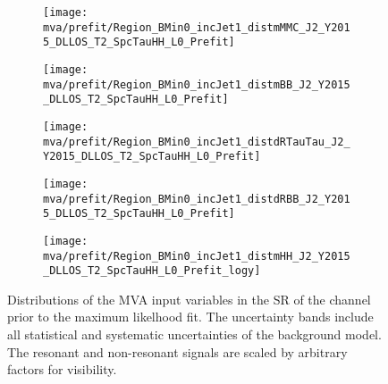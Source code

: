 \begin{figure}[htbp]
  \centering

  \begin{subfigure}[t]{.46\textwidth}
    \texttt{[image: mva/prefit/Region\_BMin0\_incJet1\_distmMMC\_J2\_Y2015\_DLLOS\_T2\_SpcTauHH\_L0\_Prefit]}
  \end{subfigure}\hfill %
  \begin{subfigure}[t]{.46\textwidth}
    \texttt{[image: mva/prefit/Region\_BMin0\_incJet1\_distmBB\_J2\_Y2015\_DLLOS\_T2\_SpcTauHH\_L0\_Prefit]}
  \end{subfigure}

  \begin{subfigure}[t]{.46\textwidth}
    \texttt{[image: mva/prefit/Region\_BMin0\_incJet1\_distdRTauTau\_J2\_Y2015\_DLLOS\_T2\_SpcTauHH\_L0\_Prefit]}
  \end{subfigure}\hfill %
  \begin{subfigure}[t]{.46\textwidth}
    \texttt{[image: mva/prefit/Region\_BMin0\_incJet1\_distdRBB\_J2\_Y2015\_DLLOS\_T2\_SpcTauHH\_L0\_Prefit]}
  \end{subfigure}

  \begin{subfigure}[t]{.46\textwidth}
    \texttt{[image: mva/prefit/Region\_BMin0\_incJet1\_distmHH\_J2\_Y2015\_DLLOS\_T2\_SpcTauHH\_L0\_Prefit\_logy]}
  \end{subfigure}

  \caption{Distributions of the MVA input variables in the SR of the
    \hadhad channel prior to the maximum likelhood fit. The
    uncertainty bands include all statistical and systematic
    uncertainties of the background model. The resonant and
    non-resonant \HH signals are scaled by arbitrary factors for
    visibility.}
  \label{fig:mva_inputs}
\end{figure}


